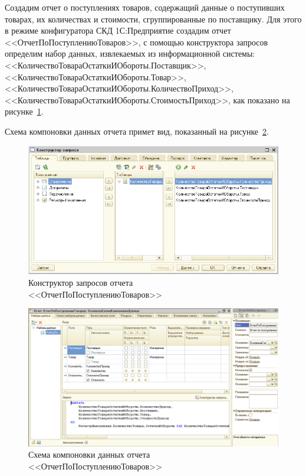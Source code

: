 Создадим отчет о поступлениях товаров,
содержащий данные о поступивших товарах, их количествах и стоимости,
сгруппированные по поставщику.
Для этого в режиме конфигуратора СКД 1С:Предприятие создадим отчет
<<ОтчетПоПоступлениюТоваров>>, с помощью конструктора запросов
определим набор данных, извлекаемых из информационной системы:
<<КоличествоТовараОстаткиИОбороты.Поставщик>>,
<<КоличествоТовараОстаткиИОбороты.Товар>>,
<<КоличествоТовараОстаткиИОбороты.КоличествоПриход>>,
<<КоличествоТовараОстаткиИОбороты.СтоимостьПриход>>,
как показано на рисунке~\ref{fig:report_input_query}.

Схема компоновки данных отчета примет вид,
показанный на рисунке~\ref{fig:report_input_scheme}.

\pagebreak

\begin{figure}[h!]
  \centering
  \includegraphics[width=150mm]{pic/report_input_query}
  \caption{Конструктор запросов отчета \\ <<ОтчетПоПоступлениюТоваров>>}
  \label{fig:report_input_query}
\end{figure}

\begin{figure}[h!]
  \centering
  \includegraphics[width=150mm]{pic/report_input_scheme}
  \caption{Схема компоновки данных отчета \\ <<ОтчетПоПоступлениюТоваров>>}
  \label{fig:report_input_scheme}
\end{figure}

